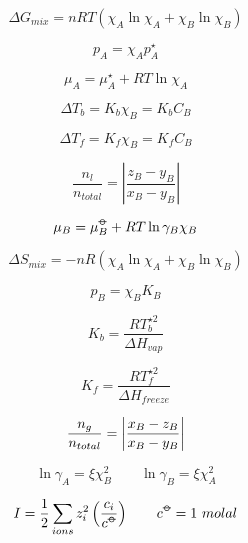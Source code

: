 \documentclass[12pt, letterpaper]{memoir}
\begin{document}
\noindent
\begin{minipage}[t]{0.5\linewidth}
	\begin{equation*}
		\Delta G_{mix} = nRT\left(\chi_A\ln\chi_A+\chi_B\ln\chi_B\right)
	\end{equation*}

	\begin{equation*}
		p_A=\chi_Ap^{\star}_A
	\end{equation*}

	\begin{equation*}
		\mu_A=\mu_A^{\star}+RT\ln\chi_A
	\end{equation*}

	\begin{equation*}
		\Delta T_b=K_b\chi_B = K_bC_B
	\end{equation*}

	\begin{equation*}
		\Delta T_f=K_f\chi_B=K_fC_B
	\end{equation*}

	\begin{equation*}
		\frac{n_l}{n_{total}}=\left|\frac{z_B-y_B}{x_B-y_B}\right|
	\end{equation*}

	\begin{equation*}
		\mu_B=\mu^{\std}_B+RT\ln\gamma_B\chi_B
	\end{equation*}
\end{minipage}
\begin{minipage}[t]{0.5\linewidth}
	\begin{equation*}
		\Delta S_{mix} = -nR\left(\chi_A\ln\chi_A+\chi_B\ln\chi_B\right)
	\end{equation*}

	\begin{equation*}
		p_B=\chi_BK_B
	\end{equation*}

	\begin{equation*}
		K_b=\frac{RT^{\star 2}_b}{\Delta H_{vap}}
	\end{equation*}

	\begin{equation*}
		K_f=\frac{RT^{\star 2}_f}{\Delta H_{freeze}}
	\end{equation*}

	\begin{equation*}
		\frac{n_g}{n_{total}}=\left| \frac{x_B-z_B}{x_B-y_B} \right|
	\end{equation*}

	\begin{equation*}
		\ln\gamma_A=\xi\chi_B^2 \hspace{2em} \ln\gamma_B=\xi\chi_A^2
	\end{equation*}

	\begin{equation*}
		I = \frac{1}{2}\sum\limits_{ions}z_i^2\left(\frac{c_i}{c^{\std}}\right) \hspace{2em} c^{\std}=1~molal
	\end{equation*}
	
\end{minipage}
\end{document}
